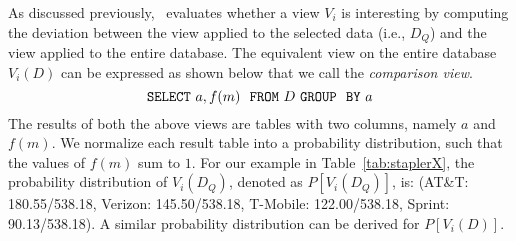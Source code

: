 As discussed previously, \VizRecDB\ evaluates
whether a view $V_i$ is interesting
by computing the deviation between the view applied to the selected data (i.e., $D_Q$) 
and the view applied to the entire database.
The equivalent view on the entire database $V_i (D)$ can be expressed as shown
below that we call the {\em comparison view}. 
$${\tt SELECT \ } a, f(m) \ \ {\tt FROM} \  D\  {\tt GROUP \ \ BY} \ a$$
The results of both the above views are tables with two columns, namely $a$ and
$f(m)$. We normalize each result table into a probability distribution, such
that the values of $f(m)$ sum to $1$.
For our example in Table~\ref{tab:staplerX}, the probability distribution of
$V_i(D_Q)$, denoted as $P[V_i (D_Q)]$, is: (AT\&T: 180.55/538.18, Verizon:
145.50/538.18, T-Mobile: 122.00/538.18,  Sprint: 90.13/538.18). 
A similar
probability distribution can be derived for $P[V_i (D)]$.

